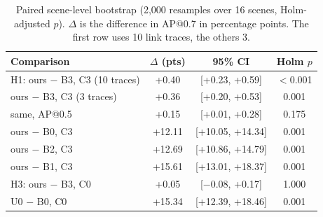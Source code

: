 \begin{table}[t]\caption{Paired scene-level bootstrap (2,000 resamples over 16 scenes, Holm-adjusted $p$). $\Delta$ is the difference in AP@0.7 in percentage points. The first row uses 10 link traces, the others 3.}\label{tab:tests}
\centering\scriptsize\setlength{\tabcolsep}{2.5pt}\begin{tabular}{lccc}\toprule Comparison & $\Delta$ (pts) & 95\% CI & Holm $p$\\\midrule
H1: ours $-$ B3, C3 (10 traces) & +0.40 & [+0.23, +0.59] & $<$0.001\\
ours $-$ B3, C3 (3 traces) & +0.36 & [+0.20, +0.53] & 0.001\\
same, AP@0.5 & +0.15 & [+0.01, +0.28] & 0.175\\
ours $-$ B0, C3 & +12.11 & [+10.05, +14.34] & 0.001\\
ours $-$ B2, C3 & +12.69 & [+10.86, +14.79] & 0.001\\
ours $-$ B1, C3 & +15.61 & [+13.01, +18.37] & 0.001\\
H3: ours $-$ B3, C0 & +0.05 & [$-$0.08, +0.17] & 1.000\\
U0 $-$ B0, C0 & +15.34 & [+12.39, +18.46] & 0.001\\
\bottomrule\end{tabular}\end{table}
